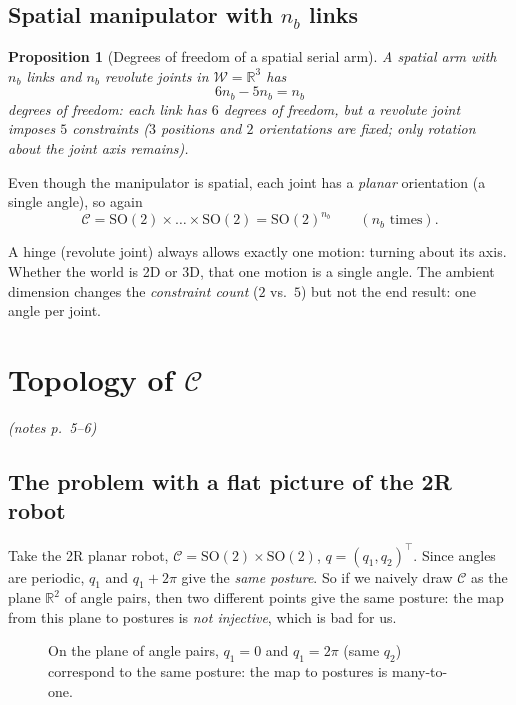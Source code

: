 \documentclass[11pt,a4paper]{article}
\newcommand{\R}{\mathbb{R}}
\newcommand{\W}{\mathcal{W}}
\newcommand{\C}{\mathcal{C}}
\newcommand{\SO}{\mathrm{SO}}
\newcommand{\pts}[1]{\emph{(notes p.~#1)}}
\theoremstyle{definition}
\theoremstyle{plain}
\newtheorem{proposition}[definition]{Proposition}
\begin{document}
\subsection{Spatial manipulator with $n_b$ links}

\begin{proposition}[Degrees of freedom of a spatial serial arm]
A spatial arm with $n_b$ links and $n_b$ revolute joints in $\W=\R^3$ has
\[
  6n_b-5n_b=n_b
\]
degrees of freedom: each link has $6$ degrees of freedom, but a revolute joint imposes $5$ constraints ($3$ positions and $2$ orientations are fixed; only rotation about the joint axis remains).
\end{proposition}

Even though the manipulator is spatial, each joint has a \emph{planar} orientation (a single angle), so again
\[
  \C=\SO(2)\times\dots\times\SO(2)=\SO(2)^{n_b}\qquad(n_b\text{ times}).
\]

\begin{intuition}
A hinge (revolute joint) always allows exactly one motion: turning about its axis. Whether the world is 2D or 3D, that one motion is a single angle. The ambient dimension changes the \emph{constraint count} ($2$ vs.\ $5$) but not the end result: one angle per joint.
\end{intuition}

\section{Topology of $\C$}\label{sec:topology}\pts{5--6}

\subsection{The problem with a flat picture of the 2R robot}

Take the 2R planar robot, $\C=\SO(2)\times\SO(2)$, $q=(q_1,q_2)^\top$. Since angles are periodic, $q_1$ and $q_1+2\pi$ give the \emph{same posture}. So if we naively draw $\C$ as the plane $\R^2$ of angle pairs, then two different points give the same posture: the map from this plane to postures is \emph{not injective}, which is bad for us.

\begin{figure}[ht]
\centering
{}
\caption{On the plane of angle pairs, $q_1=0$ and $q_1=2\pi$ (same $q_2$) correspond to the same posture: the map to postures is many-to-one.}
\end{figure}
\end{document}
